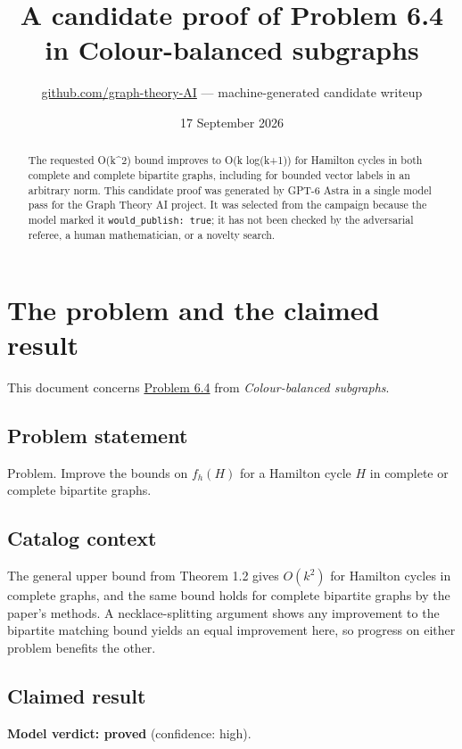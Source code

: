 \documentclass[
  11pt,
  a4paper,
]{article}
\title{A candidate proof of Problem 6.4 in Colour-balanced subgraphs}
\author{\href{https://github.com/graph-theory-AI}{github.com/graph-theory-AI}
--- machine-generated candidate writeup}
\date{17 September 2026}
\begin{document}
\maketitle
\begin{abstract}
The requested O(k\^{}2) bound improves to O(k log(k+1)) for Hamilton
cycles in both complete and complete bipartite graphs, including for
bounded vector labels in an arbitrary norm. This candidate proof was
generated by GPT-6 Astra in a single model pass for the Graph Theory AI
project. It was selected from the campaign because the model marked it
\texttt{would\_publish:\ true}; it has not been checked by the
adversarial referee, a human mathematician, or a novelty search.
\end{abstract}

\section{The problem and the claimed
result}\label{the-problem-and-the-claimed-result}

This document concerns
\href{https://graph-theory-ai.github.io/graph-conjectures/arxiv/2604.09449__03/}{Problem
6.4} from \emph{Colour-balanced subgraphs}.

\subsection{Problem statement}\label{problem-statement}

Problem. Improve the bounds on \(f_{h}(H)\) for a Hamilton cycle \(H\)
in complete or complete bipartite graphs.

\subsection{Catalog context}\label{catalog-context}

The general upper bound from Theorem 1.2 gives \(O(k^2)\) for Hamilton
cycles in complete graphs, and the same bound holds for complete
bipartite graphs by the paper's methods. A necklace-splitting argument
shows any improvement to the bipartite matching bound yields an equal
improvement here, so progress on either problem benefits the other.

\subsection{Claimed result}\label{claimed-result}

\textbf{Model verdict: proved} (confidence: high).
\end{document}

